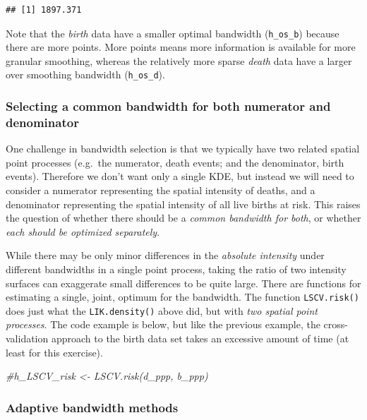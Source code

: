 \documentclass[
]{book}
\newenvironment{Shaded}{\begin{snugshade}}{\end{snugshade}}
\newcommand{\CommentTok}[1]{\textcolor[rgb]{0.56,0.35,0.01}{\textit{#1}}}
\begin{document}
\begin{verbatim}
## [1] 1897.371
\end{verbatim}

Note that the \emph{birth} data have a smaller optimal bandwidth (\texttt{h\_os\_b}) because there are more points. More points means more information is available for more granular smoothing, whereas the relatively more sparse \emph{death} data have a larger over smoothing bandwidth (\texttt{h\_os\_d}).

\hypertarget{selecting-a-common-bandwidth-for-both-numerator-and-denominator}{%
\subsubsection{Selecting a common bandwidth for both numerator and denominator}\label{selecting-a-common-bandwidth-for-both-numerator-and-denominator}}

One challenge in bandwidth selection is that we typically have two related spatial point processes (e.g.~the numerator, death events; and the denominator, birth events). Therefore we don't want only a single KDE, but instead we will need to consider a numerator representing the spatial intensity of deaths, and a denominator representing the spatial intensity of all live births at risk. This raises the question of whether there should be a \emph{common bandwidth for both}, or whether \emph{each should be optimized separately}.

While there may be only minor differences in the \emph{absolute intensity} under different bandwidths in a single point process, taking the ratio of two intensity surfaces can exaggerate small differences to be quite large. There are functions for estimating a single, joint, optimum for the bandwidth. The function \texttt{LSCV.risk()} does just what the \texttt{LIK.density()} above did, but with \emph{two spatial point processes}. The code example is below, but like the previous example, the cross-validation approach to the birth data set takes an excessive amount of time (at least for this exercise).

\begin{Shaded}
\begin{Highlighting}[]
\CommentTok{\#h\_LSCV\_risk \textless{}{-} LSCV.risk(d\_ppp, b\_ppp)}
\end{Highlighting}
\end{Shaded}

\hypertarget{adaptive-bandwidth-methods}{%
\subsubsection{Adaptive bandwidth methods}\label{adaptive-bandwidth-methods}}
\end{document}
